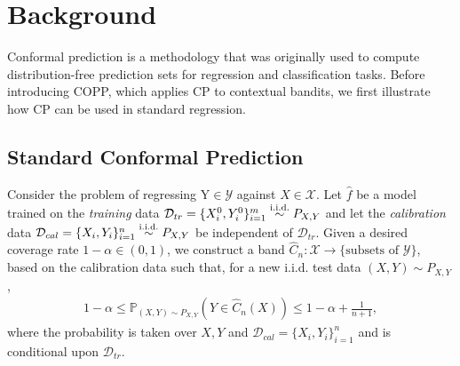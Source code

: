 \section{Background}
Conformal prediction \citep{vovk2005algorithmic, shafer2008tutorial} is a methodology that was originally used to compute distribution-free prediction sets for regression and classification tasks. Before introducing COPP, which applies CP to contextual bandits, we first illustrate how CP can be used in standard regression.



\subsection{Standard Conformal Prediction} 



Consider the problem of regressing $\mbox{Y} \in \mathcal{Y}$ against $X\in \mathcal{X}$.
Let $\hat{f}$ be a model trained on the \emph{training} data $\mathcal{D}_{tr} = \{X_i^0, Y_i^0\}_{i=1}^m \overset{\textup{i.i.d.}}{\sim} P_{X,Y}$ and let the \emph{calibration} data $\mathcal{D}_{cal} = \{X_i, Y_i\}_{i=1}^n \overset{\textup{i.i.d.}}{\sim} P_{X,Y}$ be independent of $\mathcal{D}_{tr}$. Given a desired coverage rate $1-\alpha \in (0,1)$, we construct a band $\hat{C}_n:\mathcal{X}\rightarrow \{\text{subsets of }\mathcal{Y}\}$, based on the calibration data such that, for a new i.i.d. test data $(X,Y) \sim P_{X,Y}$,
\begin{align}
    1-\alpha \leq \mathbb{P}_{(X,Y)\sim P_{X,Y}}(Y\in \hat{C}_n(X)) \leq 1-\alpha + \frac{1}{n+1}, \label{cp_guarantee}
\end{align}
where the probability is taken over $X,Y$ and $\mathcal{D}_{cal} = \{X_i, Y_i\}_{i=1}^n$ and is conditional upon $\mathcal{D}_{tr}$.

